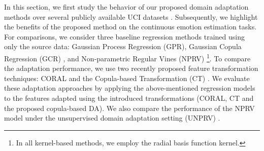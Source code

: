 \documentclass{article}
\newcommand{\todo}[1]{\textcolor{red}{#1}}
\begin{document}
    
    
In this section, we first study the behavior of our proposed domain adaptation methods over several publicly available UCI datasets \cite{Lichman:2013}. Subsequently, we highlight the benefits of the proposed method on the continuous emotion estimation tasks. For comparisons, we consider three baseline regression methods trained using only the source data: Gaussian Process Regression (GPR)\cite{Rasmussen:2005:GPM:1162254}, Gaussian Copula Regression (GCR) \cite{DBLP:conf/acl/WangH14}, and Non-parametric Regular Vines (NPRV) \cite{DBLP:journals/corr/abs-1301-0142}\footnote{In all kernel-based methods, we employ the radial basis function kernel.}. To compare the adaptation performance, we use two recently proposed feature transformation techniques: CORAL \cite{DBLP:journals/corr/SunFS15} and the Copula-based Transformation (CT) \cite{DBLP:dblp_conf/icassp/BayestehtashkSB16}. We evaluate these adaptation approaches by applying the above-mentioned regression models to the features adapted using the introduced transformations (CORAL, CT and the proposed copula-based DA). We also compare the performance of the NPRV model under the unsupervised domain adaptation setting (UNPRV) \cite{DBLP:journals/corr/abs-1301-0142}.
    
    
    
\end{document}
